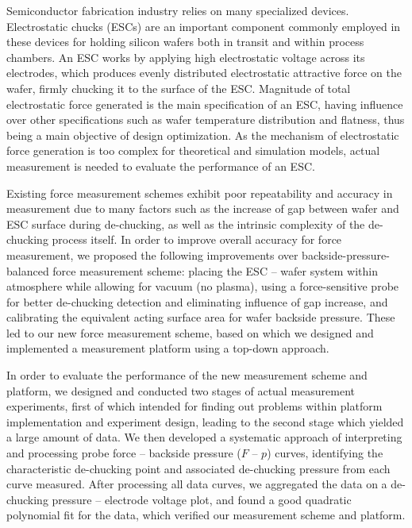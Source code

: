 \begin{eabstract}
Semiconductor fabrication industry relies on many specialized devices. Electrostatic chucks (ESCs) are an important component commonly employed in these devices for holding silicon wafers both in transit and within process chambers. An ESC works by applying high electrostatic voltage across its electrodes, which produces evenly distributed electrostatic attractive force on the wafer, firmly chucking it to the surface of the ESC. Magnitude of total electrostatic force generated is the main specification of an ESC, having influence over other specifications such as wafer temperature distribution and flatness, thus being a main objective of design optimization. As the mechanism of electrostatic force generation is too complex for theoretical and simulation models, actual measurement is needed to evaluate the performance of an ESC.

Existing force measurement schemes exhibit poor repeatability and accuracy in measurement due to many factors such as the increase of gap between wafer and ESC surface during de-chucking, as well as the intrinsic complexity of the de-chucking process itself. In order to improve overall accuracy for force measurement, we proposed the following improvements over backside-pressure-balanced force measurement scheme: placing the ESC -- wafer system within atmosphere while allowing for vacuum (no plasma), using a force-sensitive probe for better de-chucking detection and eliminating influence of gap increase, and calibrating the equivalent acting surface area for wafer backside pressure. These led to our new force measurement scheme, based on which we designed and implemented a measurement platform using a top-down approach.

In order to evaluate the performance of the new measurement scheme and platform, we designed and conducted two stages of actual measurement experiments, first of which intended for finding out problems within platform implementation and experiment design, leading to the second stage which yielded a large amount of data. We then developed a systematic approach of interpreting and processing probe force -- backside pressure ($F$ -- $p$) curves, identifying the characteristic de-chucking point and associated de-chucking pressure from each curve measured. After processing all data curves, we aggregated the data on a de-chucking pressure -- electrode voltage plot, and found a good quadratic polynomial fit for the data, which verified our measurement scheme and platform.
\end{eabstract}

